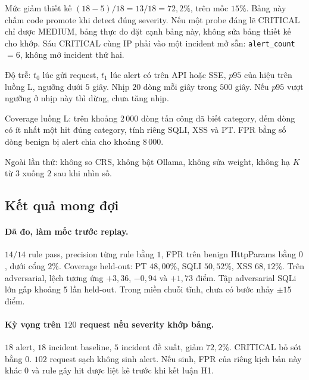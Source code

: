\documentclass[a4paper,11pt]{article}
\begin{document}
Mức giảm thiết kế $(18-5)/18 = 13/18 = 72{,}2\%$, trên mốc $15\%$. Bảng này chấm code promote khi detect đúng severity. Nếu một probe đáng lẽ CRITICAL chỉ được MEDIUM, bảng thực đo đặt cạnh bảng này, không sửa bảng thiết kế cho khớp. Sáu CRITICAL cùng IP phải vào một incident mở sẵn: \texttt{alert\_count} ${=} 6$, không mở incident thứ hai.

Độ trễ: $t_0$ lúc gửi request, $t_1$ lúc alert có trên API hoặc SSE, $p95$ của hiệu trên luồng L, ngưỡng dưới $5$ giây. Nhịp $20$ dòng mỗi giây trong $500$ giây. Nếu $p95$ vượt ngưỡng ở nhịp này thì dừng, chưa tăng nhịp.

Coverage luồng L: trên khoảng $2\,000$ dòng tấn công đã biết category, đếm dòng có ít nhất một hit đúng category, tính riêng SQLI, XSS và PT. FPR bằng số dòng benign bị alert chia cho khoảng $8\,000$.

Ngoài lần thử: không so CRS, không bật Ollama, không sửa weight, không hạ $K$ từ $3$ xuống $2$ sau khi nhìn số.

\subsection{Kết quả mong đợi}

\paragraph{Đã đo, làm mốc trước replay.}
$14/14$ rule pass, precision từng rule bằng $1$, FPR trên benign HttpParams bằng $0$, dưới cổng $2\%$. Coverage held-out: PT $48{,}00\%$, SQLI $50{,}52\%$, XSS $68{,}12\%$. Trên adversarial, lệch tương ứng $+3{,}36$, $-0{,}94$ và $+1{,}73$ điểm. Tập adversarial SQLi lớn gấp khoảng $5$ lần held-out. Trong miền chuỗi tĩnh, chưa có bước nhảy $\pm 15$ điểm.

\paragraph{Kỳ vọng trên $120$ request nếu severity khớp bảng.}
$18$ alert, $18$ incident baseline, $5$ incident đề xuất, giảm $72{,}2\%$. CRITICAL bỏ sót bằng $0$. $102$ request sạch không sinh alert. Nếu sinh, FPR của riêng kịch bản này khác $0$ và rule gây hit được liệt kê trước khi kết luận H1.
\end{document}
